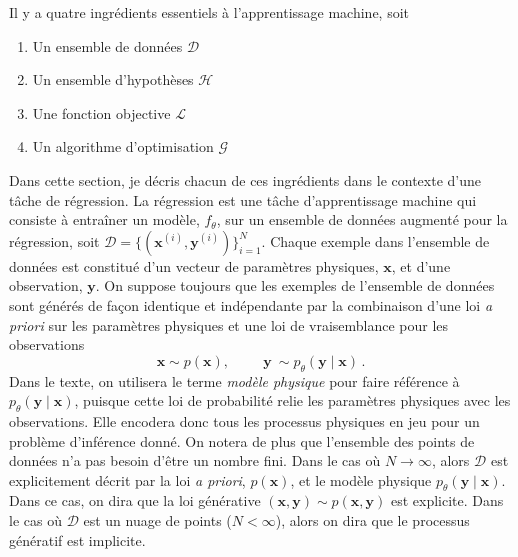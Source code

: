 Il y a quatre ingrédients essentiels à l'apprentissage machine, soit
\begin{enumerate}
        \item Un ensemble de données $\mathcal{D}$
        \item Un ensemble d'hypothèses $\mathcal{H}$
        \item Une fonction objective $\mathcal{L}$
        \item Un algorithme d'optimisation $\mathcal{G}$
\end{enumerate}
Dans cette section, je décris chacun de ces ingrédients dans le contexte d'une tâche de régression.
La régression est une tâche d'apprentissage machine qui consiste à entraîner un modèle, $f_{\theta}$, sur un ensemble de données augmenté pour la régression, soit 
$\mathcal{D} = \{(\mathbf{x}^{(i)}, \mathbf{y}^{(i)})\}_{i=1}^N$. 
Chaque exemple dans l'ensemble de données est constitué d'un vecteur de paramètres physiques, $\mathbf{x}$, et d'une observation, $\mathbf{y}$. 
On suppose toujours que les exemples de l'ensemble de données sont générés de façon identique et indépendante par la combinaison 
d'une loi \textit{a priori} sur les paramètres physiques et une loi de vraisemblance pour les observations
\begin{equation}
                \mathbf{x} \sim p(\mathbf{x}),  \hspace{1cm} \mathbf{y}\ \sim p_\theta(\mathbf{y} \mid \mathbf{x}) \, . 
\end{equation}
Dans le texte, on utilisera le terme \textit{modèle physique} pour faire référence à $p_\theta(\mathbf{y} \mid \mathbf{x})$, puisque cette loi de probabilité relie les paramètres physiques
avec les observations. Elle encodera donc tous les processus physiques en jeu pour un problème d'inférence donné.
On notera de plus que l'ensemble des points de données n'a pas besoin d'être un nombre fini. Dans le cas où $N \rightarrow  \infty$, alors 
$\mathcal{D}$ est explicitement décrit par la loi \textit{a priori}, $p(\mathbf{x})$, et le modèle physique $p_\theta(\mathbf{y} \mid \mathbf{x})$. 
Dans ce cas, on dira que la loi générative $(\mathbf{x}, \mathbf{y}) \sim p(\mathbf{x}, \mathbf{y})$ est explicite. 
Dans le cas où $\mathcal{D}$ est un nuage de points ($N < \infty$), alors on dira que le processus génératif est implicite. 

